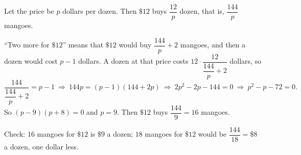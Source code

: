 Let the price be $p$ dollars per dozen. Then $\$12$ buys $\dfrac{12}{p}$ dozen, that is, $\dfrac{144}{p}$ mangoes.

``Two more for $\$12$'' means that $\$12$ would buy $\dfrac{144}{p}+2$ mangoes, and then a dozen would cost $p-1$ dollars. A dozen at that price costs $12\cdot\dfrac{12}{\dfrac{144}{p}+2}$ dollars, so
\[
\dfrac{144}{\dfrac{144}{p}+2}=p-1\ \Longrightarrow\ 144p=(p-1)(144+2p)\ \Longrightarrow\ 2p^2-2p-144=0\ \Longrightarrow\ p^2-p-72=0 .
\]
So $(p-9)(p+8)=0$ and $p=9$. Then $\$12$ buys $\dfrac{144}{9}=\boxed{16}$ mangoes.

Check: $16$ mangoes for $\$12$ is $\$9$ a dozen; $18$ mangoes for $\$12$ would be $\dfrac{144}{18}=\$8$ a dozen, one dollar less.
